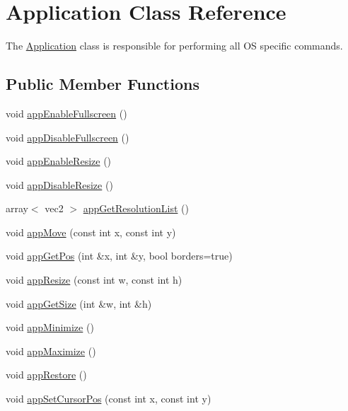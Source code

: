 \hypertarget{class_application}{\section{Application Class Reference}
\label{class_application}
}


The \hyperlink{class_application}{Application} class is responsible for performing all O\-S specific commands.  


\subsection*{Public Member Functions}
\begin{DoxyCompactItemize}
\item 
void \hyperlink{class_application_a058309652fa5b8a6bbacb6d19d765404}{app\-Enable\-Fullscreen} ()
\item 
void \hyperlink{class_application_a8f06182cfb4e7abec9608c2692bc93ad}{app\-Disable\-Fullscreen} ()
\item 
void \hyperlink{class_application_ab5b54c0a8e547ee0ab2bce9fbdb792a5}{app\-Enable\-Resize} ()
\item 
void \hyperlink{class_application_a242fc13b0ed9a143e4416d00d7de3199}{app\-Disable\-Resize} ()
\item 
array$<$ vec2 $>$ \hyperlink{class_application_a5b02c95e118a79ff29e4f9cc95e492c8}{app\-Get\-Resolution\-List} ()
\item 
void \hyperlink{class_application_ade77d59e07c39e8d053dec4e1fa6cf0a}{app\-Move} (const int x, const int y)
\item 
void \hyperlink{class_application_aa315981fa7c63165e6cad738de05acb3}{app\-Get\-Pos} (int \&x, int \&y, bool borders=true)
\item 
void \hyperlink{class_application_a3eae706a0f0ce5e5ccfc2d93a2c9483a}{app\-Resize} (const int w, const int h)
\item 
void \hyperlink{class_application_a361001d71f1cd930712aae29b30303ea}{app\-Get\-Size} (int \&w, int \&h)
\item 
void \hyperlink{class_application_abd1ddbf3839ed8f8a820f7bb21474106}{app\-Minimize} ()
\item 
void \hyperlink{class_application_a196583d4fcabd6b99cc7d717f11f2e06}{app\-Maximize} ()
\item 
void \hyperlink{class_application_aa69f401b598507a626d6ae31032c5b07}{app\-Restore} ()
\item 
void \hyperlink{class_application_a55bb1d96e5cff13b86ccd8a42edf7cdc}{app\-Set\-Cursor\-Pos} (const int x, const int y)

\end{DoxyCompactItemize}

